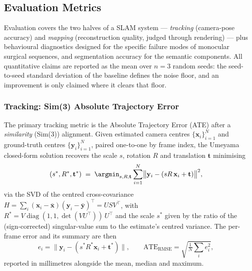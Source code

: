 \subsection{Evaluation Metrics}
\label{sec:eval_metrics}

Evaluation covers the two halves of a SLAM system --- \emph{tracking} (camera-pose
accuracy) and \emph{mapping} (reconstruction quality, judged through rendering) ---
plus behavioural diagnostics designed for the specific failure modes of monocular
surgical sequences, and segmentation accuracy for the semantic components. All
quantitative claims are reported as the mean over $n{=}3$ random seeds: the
seed-to-seed standard deviation of the baseline defines the noise floor, and an
improvement is only claimed where it clears that floor.

\subsubsection{Tracking: Sim(3) Absolute Trajectory Error}
\label{sec:eval_ate}

The primary tracking metric is the Absolute Trajectory Error (ATE) after a
\emph{similarity} (Sim(3)) alignment. Given estimated camera centres
$\{\mathbf{x}_i\}_{i=1}^{N}$ and ground-truth centres $\{\mathbf{y}_i\}_{i=1}^{N}$,
paired one-to-one by frame index, the Umeyama closed-form solution
\cite{umeyama1991} recovers the scale $s$, rotation $R$ and translation
$\mathbf{t}$ minimising
\begin{equation}
  (s^\ast, R^\ast, \mathbf{t}^\ast)
  \;=\; \argmin_{s,R,\mathbf{t}} \sum_{i=1}^{N}
  \bigl\lVert \mathbf{y}_i - \left( sR\,\mathbf{x}_i + \mathbf{t} \right) \bigr\rVert^2 ,
  \label{eq:umeyama}
\end{equation}
via the SVD of the centred cross-covariance $H = \sum_i
(\mathbf{x}_i - \bar{\mathbf{x}})(\mathbf{y}_i - \bar{\mathbf{y}})^{\!\top} = U S V^{\!\top}$,
with $R^\ast = V \operatorname{diag}(1,1,\det(VU^{\!\top}))\, U^{\!\top}$ and the scale
$s^\ast$ given by the ratio of the (sign-corrected) singular-value sum to the
estimate's centred variance. The per-frame error and its summary are then
\begin{equation}
  e_i = \bigl\lVert \mathbf{y}_i - \left( s^\ast R^\ast \mathbf{x}_i + \mathbf{t}^\ast \right)\bigr\rVert,
  \qquad
  \mathrm{ATE}_{\mathrm{RMSE}} = \sqrt{\tfrac{1}{N}\textstyle\sum_i e_i^2},
\end{equation}
reported in millimetres alongside the mean, median and maximum.

